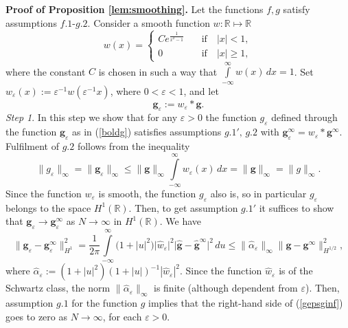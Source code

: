 \documentclass{article}
\numberwithin{equation}{section}
\newcommand{\mR}{\mathbb{R}}
\newcommand{\eps}{\varepsilon}
\newcommand{\al}{\alpha}
\newcommand{\ra}{\rightarrow}
\newcommand{\fr}{\frac}
\newcommand{\qu}{\quad}
\newcommand{\ili}{\int\limits}
\newcommand{\ilif}{\ili_{-\infty}^\infty}
\newcommand{\lbl}{\label}
\newcommand{\bee}{\begin{equation}}
\newcommand{\eee}{\end{equation}}
\begin{document}
{\bf Proof of Proposition \ref{lem:smoothing}.}
Let the functions $f, g$ satisfy
assumptions $f.1$-$g.2$.
Consider a smooth function $w:\mR\mapsto\mR$
$$
w(x)=\left\{
\begin{array}{cl}
Ce^{\fr{1}{x^2-1}} \quad &\mbox{if}\qu |x|<1,
\\
0 \quad &\mbox{if}\qu |x|\geq 1,
\end{array}
\right.
$$
where the constant $C$ is chosen in such a way that
$\ilif w(x)\,dx =1$.
Set $w_\eps(x):=\eps^{-1}w(\eps^{-1} x)$, where $0<\eps< 1$,
and let
$$
\bm g_{\eps}:=w_\eps*\bm g.
$$
{\it Step 1}. In this step we show that for any $\eps>0$ the function $g_{\eps}$
defined through the function $\bm g_{\eps}$
as in (\ref{boldg})
satisfies assumptions $g.1',\,g.2$
with $\bm g_{\eps}^\infty=w_\eps*\bm g^\infty$.
Fulfilment of $g.2$
follows from the inequality
$$
\|g_{\eps}\|_\infty
=\|\bm g_{\eps}\|_\infty
\leq \|\bm g\|_\infty \ilif w_\eps(x)\,dx=
\|\bm g\|_\infty=
\|g\|_\infty.
$$
Since the function $w_\eps$ is smooth,
the function $g_{\eps}$ also is,
so in particular $g_{\eps}$ belongs to the space $H^1(\mR)$.
Then, to get assumption $g.1'$ it suffices to show that
$\bm g_{\eps}\ra \bm g_{\eps}^\infty$ as $N\ra\infty$
in $H^1(\mR)$.
We have
\bee\lbl{gepsginf}
\|\bm g_{\eps}-\bm g_{\eps}^\infty\|_{H^1}^2 =
\fr{1}{2\pi}\ilif
\big( 1+|u|^2\big)
\big|\hat w_\eps\big|^2
\big|\hat{\bm g}-\hat{\bm g}^\infty\big|^2 \,du
\leq \| \hat\al_\eps \|_\infty \|\bm g-\bm g^\infty\|_{H^{1/2}}^2,
\eee
where $\hat\al_\eps:=(1+|u|^2)(1+|u|)^{-1} |\hat w_\eps|^2$.
Since the function
$\hat w_\eps$ is of the Schwartz class,
the norm $\|\hat\al_\eps\|_\infty$ is finite 
(although dependent from $\eps$).
Then, assumption $g.1$ for the function $g$ implies
that the right-hand side of (\ref{gepsginf}) goes to zero as $N\ra\infty$,
for each $\eps>0$.
\end{document}

